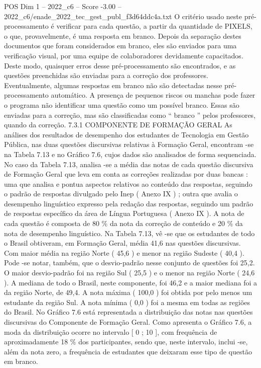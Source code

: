 \begin{textsample}{POS Dim 1 – 2022\_c6 – Score -3.00 – 2022\_c6/enade\_2022\_tec\_gest\_publ\_f3d64ddc4a.txt}
O critério usado neste pré-processamento é verificar para cada questão, a partir da quantidade de PIXELS, o que, provavelmente, é uma resposta em branco.
Depois da separação destes documentos que foram considerados em branco, eles são enviados para uma verificação visual, por uma equipe de colaboradores devidamente capacitados.
Deste modo, quaisquer erros desse pré-processamento são encontrados, e as questões preenchidas são enviadas para a correção dos professores.
Eventualmente, algumas respostas em branco não são detectadas nesse pré-processamento automático.
A presença de pequenos riscos ou manchas pode fazer o programa não identificar uma questão como um possível branco.
Essas são enviadas para a correção, mas são classificadas como “ branco ” pelos professores, quando da correção. 7.3.1 COMPONENTE DE FORMAÇÃO GERAL As análises dos resultados de desempenho dos estudantes de Tecnologia em Gestão Pública, nas duas questões discursivas relativas à Formação Geral, encontram -se na Tabela 7.13 e no Gráfico 7.6, cujos dados são analisados de forma sequenciada.
No caso da Tabela 7.13, analisa -se a média das notas de cada questão discursiva de Formação Geral que leva em conta as correções realizadas por duas bancas : uma que analisa e pontua aspectos relativos ao conteúdo das respostas, seguindo o padrão de respostas divulgado pelo Inep ( Anexo IX ) ; outra que avalia o desempenho linguístico expresso pela redação das respostas, seguindo um padrão de respostas específico da área de Língua Portuguesa ( Anexo IX ).
A nota de cada questão é composta de 80 \% da nota da correção de conteúdo e 20 \% da nota de desempenho linguístico.
Na Tabela 7.13, vê -se que os estudantes de todo o Brasil obtiveram, em Formação Geral, média 41,6 nas questões discursivas.
Com maior média na região Norte ( 45,6 ) e menor na região Sudeste ( 40,4 ).
Pode -se notar, também, que o desvio-padrão nesse conjunto de questões foi 25,2.
O maior desvio-padrão foi na região Sul ( 25,5 ) e o menor na região Norte ( 24,6 ).
A mediana de todo o Brasil, neste componente, foi 46,2 e a maior mediana foi a da região Norte, de 49,4.
A nota máxima ( 100,0 ) foi obtida por pelo menos um estudante da região Sul.
A nota mínima ( 0,0 ) foi a mesma em todas as regiões do Brasil.
No Gráfico 7.6 está representada a distribuição das notas nas questões discursivas do Componente de Formação Geral.
Como apresenta o Gráfico 7.6, a moda da distribuição ocorre no intervalo [ 0 ; 10 ], com frequência de aproximadamente 18 \% dos participantes, sendo que, neste intervalo, inclui -se, além da nota zero, a frequência de estudantes que deixaram esse tipo de questão em branco.

\end{textsample}
